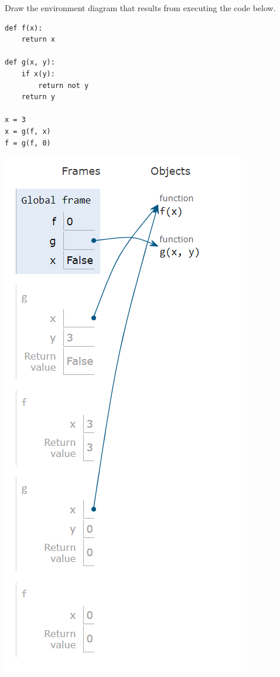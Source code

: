 
\begin{blocksection}
\question Draw the environment diagram that results from executing the
code below.

\begin{lstlisting}
def f(x):
	return x

def g(x, y):
	if x(y):
		return not y
	return y

x = 3
x = g(f, x)
f = g(f, 0)
\end{lstlisting}

\begin{solution}[2.5in]
\begin{center}
\includegraphics{xfg.png}
\end{center}
\end{solution}
\end{blocksection}
